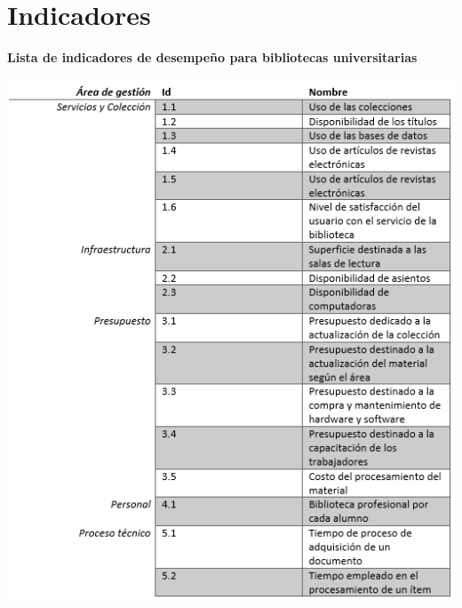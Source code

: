 \section{Indicadores} 

\textbf{Lista de indicadores de desempeño para bibliotecas universitarias}\\

\vspace{16mm} %
\begin{center}
\includegraphics[width=17cm]{./Imagenes/002}
\end{center}	
\vspace{7mm} %




